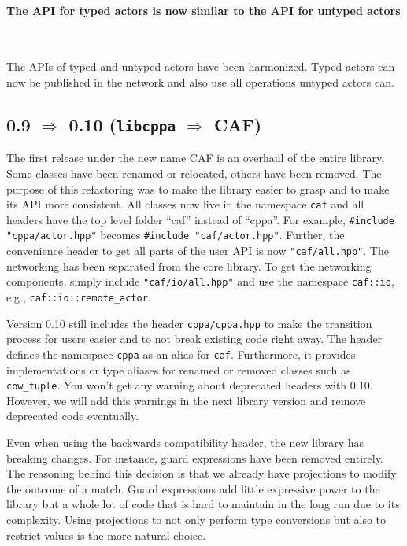 \paragraph{The API for typed actors is now similar to the API for untyped actors}

~

The APIs of typed and untyped actors have been harmonized.
Typed actors can now be published in the network and also use all operations untyped actors can.

\clearpage
\subsection{0.9 $\Rightarrow$ 0.10 (\texttt{libcppa} $\Rightarrow$ CAF)}

The first release under the new name CAF is an overhaul of the entire library.
Some classes have been renamed or relocated, others have been removed.
The purpose of this refactoring was to make the library easier to grasp and to make its API more consistent.
All classes now live in the namespace \lstinline^caf^ and all headers have the top level folder ``caf'' instead of ``cppa''.
For example, \lstinline^#include "cppa/actor.hpp"^ becomes \lstinline^#include "caf/actor.hpp"^.
Further, the convenience header to get all parts of the user API is now \lstinline^"caf/all.hpp"^.
The networking has been separated from the core library.
To get the networking components, simply include \lstinline^"caf/io/all.hpp"^ and use the namespace \lstinline^caf::io^, e.g., \lstinline^caf::io::remote_actor^.

Version 0.10 still includes the header \lstinline^cppa/cppa.hpp^ to make the transition process for users easier and to not break existing code right away.
The header defines the namespace \lstinline^cppa^ as an alias for \lstinline^caf^.
Furthermore, it provides implementations or type aliases for renamed or removed classes such as \lstinline^cow_tuple^.
You won't get any warning about deprecated headers with 0.10.
However, we will add this warnings in the next library version and remove deprecated code eventually.

Even when using the backwards compatibility header, the new library has breaking changes.
For instance, guard expressions have been removed entirely.
The reasoning behind this decision is that we already have projections to modify the outcome of a match.
Guard expressions add little expressive power to the library but a whole lot of code that is hard to maintain in the long run due to its complexity.
Using projections to not only perform type conversions but also to restrict values is the more natural choice.


